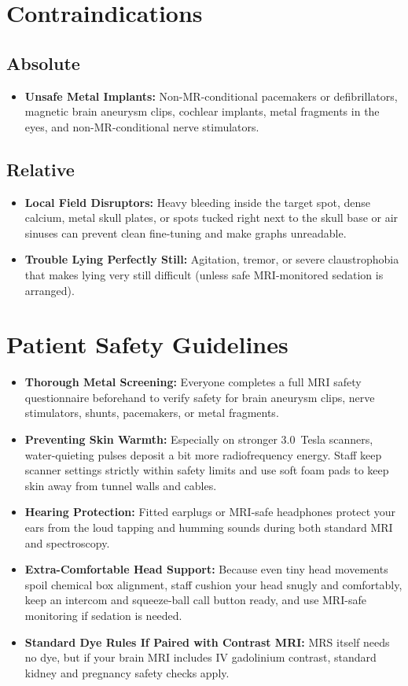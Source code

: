 \section{Contraindications}

\subsection{Absolute}
\begin{itemize}
\item \textbf{Unsafe Metal Implants:} Non-MR-conditional pacemakers or defibrillators, magnetic brain aneurysm clips, cochlear implants, metal fragments in the eyes, and non-MR-conditional nerve stimulators.
\end{itemize}

\subsection{Relative}
\begin{itemize}
\item \textbf{Local Field Disruptors:} Heavy bleeding inside the target spot, dense calcium, metal skull plates, or spots tucked right next to the skull base or air sinuses can prevent clean fine-tuning and make graphs unreadable.
\item \textbf{Trouble Lying Perfectly Still:} Agitation, tremor, or severe claustrophobia that makes lying very still difficult (unless safe MRI-monitored sedation is arranged).
\end{itemize}

\section{Patient Safety Guidelines}
\begin{itemize}
\item \textbf{Thorough Metal Screening:} Everyone completes a full MRI safety questionnaire beforehand to verify safety for brain aneurysm clips, nerve stimulators, shunts, pacemakers, or metal fragments.
\item \textbf{Preventing Skin Warmth:} Especially on stronger 3.0~Tesla scanners, water-quieting pulses deposit a bit more radiofrequency energy. Staff keep scanner settings strictly within safety limits and use soft foam pads to keep skin away from tunnel walls and cables.
\item \textbf{Hearing Protection:} Fitted earplugs or MRI-safe headphones protect your ears from the loud tapping and humming sounds during both standard MRI and spectroscopy.
\item \textbf{Extra-Comfortable Head Support:} Because even tiny head movements spoil chemical box alignment, staff cushion your head snugly and comfortably, keep an intercom and squeeze-ball call button ready, and use MRI-safe monitoring if sedation is needed.
\item \textbf{Standard Dye Rules If Paired with Contrast MRI:} MRS itself needs no dye, but if your brain MRI includes IV gadolinium contrast, standard kidney and pregnancy safety checks apply.
\end{itemize}

